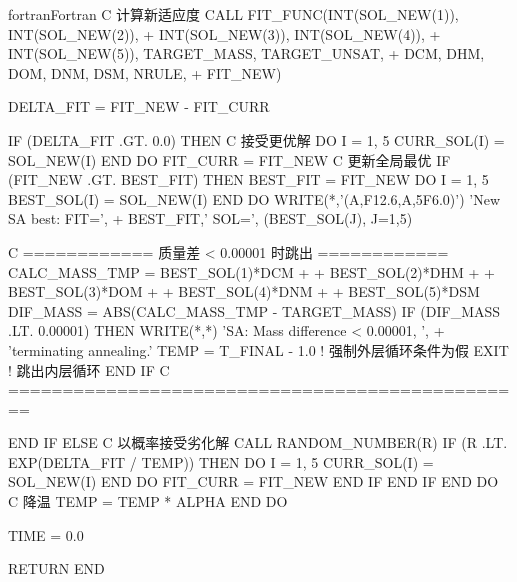 \begin{envcode}{fortran}{Fortran}
C             计算新适应度
              CALL FIT_FUNC(INT(SOL_NEW(1)), INT(SOL_NEW(2)),
     +                      INT(SOL_NEW(3)), INT(SOL_NEW(4)),
     +                      INT(SOL_NEW(5)), TARGET_MASS, TARGET_UNSAT,
     +                      DCM, DHM, DOM, DNM, DSM, NRULE,
     +                      FIT_NEW)
              
              DELTA_FIT = FIT_NEW - FIT_CURR
              
              IF (DELTA_FIT .GT. 0.0) THEN
C                 接受更优解
                  DO I = 1, 5
                      CURR_SOL(I) = SOL_NEW(I)
                  END DO
                  FIT_CURR = FIT_NEW
C                 更新全局最优
                  IF (FIT_NEW .GT. BEST_FIT) THEN
                      BEST_FIT = FIT_NEW
                      DO I = 1, 5
                          BEST_SOL(I) = SOL_NEW(I)
                      END DO
                      WRITE(*,'(A,F12.6,A,5F6.0)') 'New SA best: FIT=', 
     +                BEST_FIT,' SOL=', (BEST_SOL(J), J=1,5)

C         ============ 质量差 < 0.00001 时跳出 ============
                      CALC_MASS_TMP = BEST_SOL(1)*DCM 
     +                              + BEST_SOL(2)*DHM
     +                              + BEST_SOL(3)*DOM
     +                              + BEST_SOL(4)*DNM
     +                              + BEST_SOL(5)*DSM
                      DIF_MASS = ABS(CALC_MASS_TMP - TARGET_MASS)
                      IF (DIF_MASS .LT. 0.00001) THEN
                          WRITE(*,*) 'SA: Mass difference < 0.00001, ',
     +                               'terminating annealing.'
                          TEMP = T_FINAL - 1.0   ! 强制外层循环条件为假
                          EXIT                    ! 跳出内层循环
                      END IF
C         ================================================

                  END IF
              ELSE
C                 以概率接受劣化解
                  CALL RANDOM_NUMBER(R)
                  IF (R .LT. EXP(DELTA_FIT / TEMP)) THEN
                      DO I = 1, 5
                          CURR_SOL(I) = SOL_NEW(I)
                      END DO
                      FIT_CURR = FIT_NEW
                  END IF
              END IF
          END DO
C         降温
          TEMP = TEMP * ALPHA
      END DO
      
      TIME = 0.0
      
      RETURN
      END
\end{envcode}